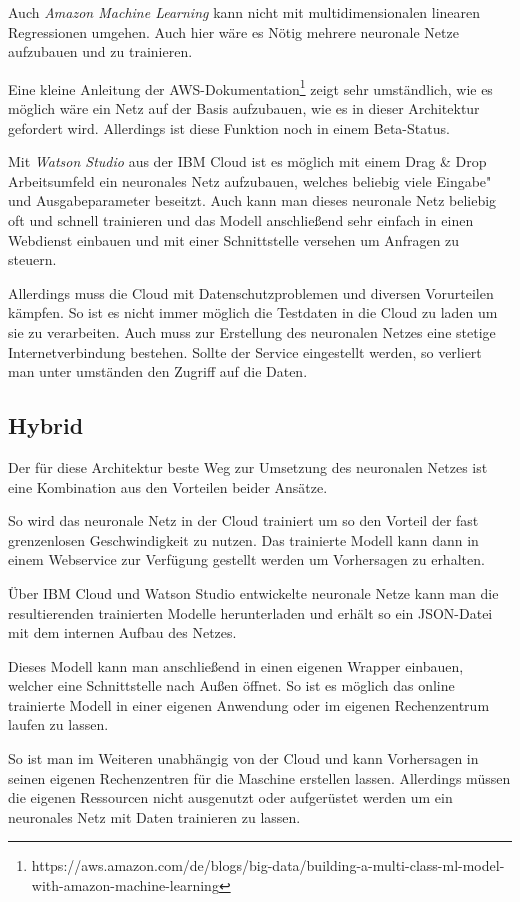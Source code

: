 Auch \textit{Amazon Machine Learning} kann nicht mit multidimensionalen linearen Regressionen umgehen. Auch hier wäre es
Nötig mehrere neuronale Netze aufzubauen und zu trainieren.

Eine kleine Anleitung der
AWS-Dokumentation\footnote{https://aws.amazon.com/de/blogs/big-data/building-a-multi-class-ml-model-with-amazon-machine-learning}
zeigt sehr umständlich, wie es möglich wäre ein Netz auf der Basis aufzubauen, wie es in dieser Architektur gefordert
wird. Allerdings ist diese Funktion noch in einem Beta-Status.

Mit \textit{Watson Studio} aus der IBM Cloud ist es möglich mit einem Drag \& Drop Arbeitsumfeld ein neuronales Netz
aufzubauen, welches beliebig viele Eingabe"~ und Ausgabeparameter beseitzt. Auch kann man dieses neuronale Netz beliebig
oft und schnell trainieren und das Modell anschließend sehr einfach in einen Webdienst einbauen und mit einer
Schnittstelle versehen um Anfragen zu steuern.

Allerdings muss die Cloud mit Datenschutzproblemen und diversen Vorurteilen kämpfen. So ist es nicht immer möglich die
Testdaten in die Cloud zu laden um sie zu verarbeiten. Auch muss zur Erstellung des neuronalen Netzes eine stetige
Internetverbindung bestehen. Sollte der Service eingestellt werden, so verliert man unter umständen den Zugriff auf die
Daten.

\subsection{Hybrid}
Der für diese Architektur beste Weg zur Umsetzung des neuronalen Netzes ist eine Kombination aus den Vorteilen beider
Ansätze.

So wird das neuronale Netz in der Cloud trainiert um so den Vorteil der fast grenzenlosen Geschwindigkeit zu nutzen. Das
trainierte Modell kann dann in einem Webservice zur Verfügung gestellt werden um Vorhersagen zu erhalten.

Über IBM Cloud und Watson Studio entwickelte neuronale Netze kann man die resultierenden trainierten Modelle
herunterladen und erhält so ein JSON-Datei mit dem internen Aufbau des Netzes.

Dieses Modell kann man anschließend in einen eigenen Wrapper einbauen, welcher eine Schnittstelle nach Außen öffnet. So
ist es möglich das online trainierte Modell in einer eigenen Anwendung oder im eigenen Rechenzentrum laufen zu lassen.

So ist man im Weiteren unabhängig von der Cloud und kann Vorhersagen in seinen eigenen Rechenzentren für die Maschine
erstellen lassen. Allerdings müssen die eigenen Ressourcen nicht ausgenutzt oder aufgerüstet werden um ein neuronales
Netz mit Daten trainieren zu lassen.